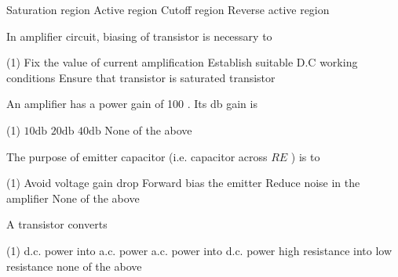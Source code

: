 \begin{enumerate}
\begin{tasks}
	\task[\textbf{A.}] Saturation region
	\task[\textbf{B.}]  Active region
	\task[\textbf{C.}] Cutoff region
	\task[\textbf{D.}]Reverse active region
\end{tasks}
\begin{minipage}{\textwidth}
	\item In amplifier circuit, biasing of transistor is necessary to
\end{minipage}
\begin{tasks}(1)
	\task[\textbf{A.}] Fix the value of current amplification
	\task[\textbf{B.}]Establish suitable D.C working conditions 
	\task[\textbf{C.}]Ensure that transistor is saturated
	\task[\textbf{D.}]transistor
\end{tasks}
\begin{minipage}{\textwidth}
	\item  An amplifier has a power gain of 100 . Its db gain is
\end{minipage}
\begin{tasks}(1)
	\task[\textbf{A.}] $10 \mathrm{db}$
	\task[\textbf{B.}] $20 \mathrm{db}$
	\task[\textbf{C.}]$40 \mathrm{db}$
	\task[\textbf{D.}] None of the above
\end{tasks}
\begin{minipage}{\textwidth}
	\item The purpose of emitter capacitor (i.e. capacitor across $R E$ ) is to
\end{minipage}
\begin{tasks}(1)
	\task[\textbf{A.}]  Avoid voltage gain drop
	\task[\textbf{B.}] Forward bias the emitter
	\task[\textbf{C.}]Reduce noise in the amplifier
	\task[\textbf{D.}]None of the above
\end{tasks}
\begin{minipage}{\textwidth}
	\item  A transistor converts
\end{minipage}
\begin{tasks}(1)
	\task[\textbf{A.}]d.c. power into a.c. power 
	\task[\textbf{B.}] a.c. power into d.c. power
	\task[\textbf{C.}]high resistance into low resistance
	\task[\textbf{D.}]none of the above
\end{tasks}
\end{enumerate}
\setlength\arrayrulewidth{1pt}
